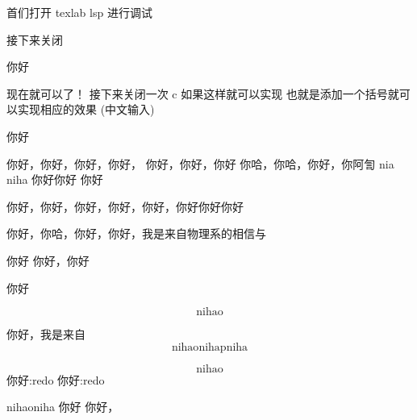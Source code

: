 首们打开 texlab lsp 进行调试

接下来关闭

你好
\begin{figure}
\end{figure}

现在就可以了！
接下来关闭一次
c
如果这样就可以实现
 也就是添加一个括号就可以实现相应的效果 (中文输入)

你好


你好，你好，你好，你好，
你好，你好，你好
你哈，你哈，你好，你阿訇 nia
niha 你好你好 你好

你好，你好，你好，你好，你好，你好你好你好

你好，你哈，你好，你好，我是来自物理系的相信与

你好 你好，你好

你好

\begin{equation}
	\text{nihao}
\end{equation}

你好，我是来自
\begin{equation}
	\text{nihao}
	\text{nihap}
	\text{niha}
\end{equation}

\begin{equation}
	\text{nihao}
\end{equation}
你好:redo
你好:redo

nihaoniha
你好
你好，
